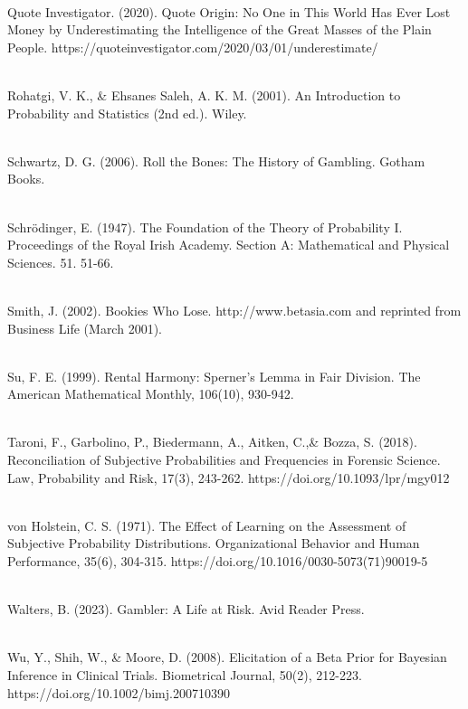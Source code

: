 \documentclass[sn-mathphys-num]{sn-jnl}
\theoremstyle{thmstyleone}%
\theoremstyle{thmstyletwo}%
\theoremstyle{thmstylethree}%
\begin{document}
\begin{thebibliography}{9}
\\Quote Investigator. (2020). Quote Origin: No One in This World Has Ever Lost Money by Underestimating the Intelligence of the Great Masses of the Plain People. https://quoteinvestigator.com/2020/03/01/underestimate/ \vspace{5pt}

\\Rohatgi, V. K., \& Ehsanes Saleh, A. K. M. (2001). An Introduction to Probability and Statistics (2nd ed.). Wiley. \vspace{5pt}

\\Schwartz, D. G. (2006). Roll the Bones: The History of Gambling. Gotham Books. \vspace{5pt}

\\Schr\"{o}dinger, E. (1947). The Foundation of the Theory of Probability I. Proceedings of the Royal Irish Academy. Section A: Mathematical and Physical Sciences. 51. 51-66. \vspace{5pt}

\\Smith, J. (2002). Bookies Who Lose. http://www.betasia.com and reprinted from Business Life (March 2001). \vspace{5pt}

\\Su, F. E. (1999). Rental Harmony: Sperner's Lemma in Fair Division. The American Mathematical Monthly, 106(10), 930-942. \vspace{5pt}

\\Taroni, F., Garbolino, P., Biedermann, A., Aitken, C.,\& Bozza, S. (2018). Reconciliation of Subjective Probabilities and Frequencies in Forensic Science. Law, Probability and Risk, 17(3), 243-262. https://doi.org/10.1093/lpr/mgy012 \vspace{5pt}

\\von Holstein, C. S. (1971). The Effect of Learning on the Assessment of Subjective Probability Distributions. Organizational Behavior and Human Performance, 35(6), 304-315. https://doi.org/10.1016/0030-5073(71)90019-5 \vspace{5pt}

\\Walters, B. (2023). Gambler: A Life at Risk. Avid Reader Press. \vspace{5pt}

\\Wu, Y., Shih, W., \& Moore, D. (2008). Elicitation of a Beta Prior for Bayesian Inference in Clinical Trials. Biometrical Journal, 50(2), 212-223. https://doi.org/10.1002/bimj.200710390
\end{thebibliography}
\end{document}
